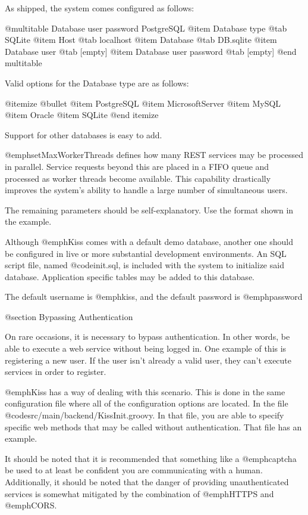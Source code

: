 As shipped, the system comes configured as follows:

@multitable {Database user password} {PostgreSQL} 
@item Database type
@tab SQLite
@item Host
@tab localhost
@item Database
@tab DB.sqlite
@item Database user
@tab [empty]
@item Database user password
@tab [empty]
@end multitable

Valid options for the Database type are as follows:

@itemize @bullet
@item
PostgreSQL
@item
MicrosoftServer
@item
MySQL
@item
Oracle
@item
SQLite
@end itemize

Support for other databases is easy to add.

@emph{setMaxWorkerThreads} defines how many REST services may be
processed in parallel.  Service requests beyond this are placed in a
FIFO queue and processed as worker threads become available.  This
capability drastically improves the system's ability to handle a large
number of simultaneous users.

The remaining parameters should be self-explanatory.  Use the format
shown in the example.

Although @emph{Kiss} comes with a default demo database, another one
should be configured in live or more substantial development
environments.  An SQL script file, named @code{init.sql}, is included
with the system to initialize said database.  Application specific tables
may be added to this database.

The default username is @emph{kiss}, and the default password is
@emph{password}

@section Bypassing Authentication

On rare occasions, it is necessary to bypass authentication.  In other
words, be able to execute a web service without being logged in.  One
example of this is registering a new user.  If the user isn't already a
valid user, they can't execute services in order to register.

@emph{Kiss} has a way of dealing with this scenario.  This is done in
the same configuration file where all of the configuration options are
located.  In the file @code{src/main/backend/KissInit.groovy}.  In
that file, you are able to specify specific web methods that may be
called without authentication.  That file has an example.

It should be noted that it is recommended that something like a
@emph{captcha} be used to at least be confident you are
communicating with a human.  Additionally, it should be noted that the
danger of providing unauthenticated services is somewhat mitigated by
the combination of @emph{HTTPS} and @emph{CORS}.

